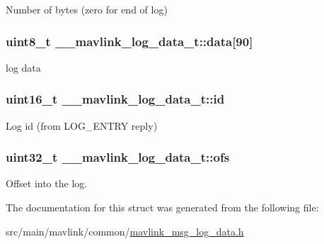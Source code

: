 Number of bytes (zero for end of log) 

\hypertarget{struct____mavlink__log__data__t_ae64beb1618aeac94fade1f2dc8607107}{
\subsubsection[{data}]{\setlength{\rightskip}{0pt plus 5cm}uint8\+\_\+t \+\_\+\+\_\+mavlink\+\_\+log\+\_\+data\+\_\+t\+::data\mbox{[}90\mbox{]}}}\label{struct____mavlink__log__data__t_ae64beb1618aeac94fade1f2dc8607107}


log data 

\hypertarget{struct____mavlink__log__data__t_aabe2a71a6a74df8e05fa48bf2a16f9d0}{
\subsubsection[{id}]{\setlength{\rightskip}{0pt plus 5cm}uint16\+\_\+t \+\_\+\+\_\+mavlink\+\_\+log\+\_\+data\+\_\+t\+::id}}\label{struct____mavlink__log__data__t_aabe2a71a6a74df8e05fa48bf2a16f9d0}


Log id (from L\+O\+G\+\_\+\+E\+N\+T\+R\+Y reply) 

\hypertarget{struct____mavlink__log__data__t_a1a0610442e473dbbe22b2f4543cf4932}{
\subsubsection[{ofs}]{\setlength{\rightskip}{0pt plus 5cm}uint32\+\_\+t \+\_\+\+\_\+mavlink\+\_\+log\+\_\+data\+\_\+t\+::ofs}}\label{struct____mavlink__log__data__t_a1a0610442e473dbbe22b2f4543cf4932}


Offset into the log. 



The documentation for this struct was generated from the following file\+:\begin{DoxyCompactItemize}
\item 
src/main/mavlink/common/\hyperlink{mavlink__msg__log__data_8h}{mavlink\+\_\+msg\+\_\+log\+\_\+data.\+h}\end{DoxyCompactItemize}
